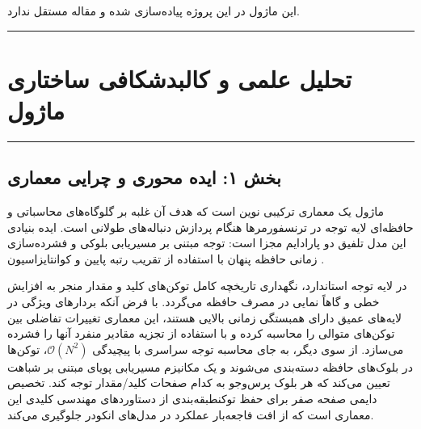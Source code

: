 \clearpage
{}
\vspace*{0.2cm}

این ماژول در این پروژه پیاده‌سازی شده و مقاله مستقل ندارد.
\noindent\rule{\textwidth}{1.2pt}
\vspace*{0.1cm}
\section{تحلیل علمی و کالبدشکافی ساختاری ماژول }
\label{sec:mod_moe_deltakv_paged}
\vspace*{-0.2cm}
\noindent\rule{\textwidth}{0.5pt}
\vspace*{0.3cm}

\subsection*{بخش ۱: ایده محوری و چرایی معماری }
ماژول  یک معماری ترکیبی نوین است که هدف آن غلبه بر گلوگاه‌های محاسباتی و حافظه‌ای لایه توجه در ترنسفورمرها هنگام پردازش دنباله‌های طولانی است. ایده بنیادی این مدل تلفیق دو پارادایم مجزا است: توجه مبتنی بر مسیریابی بلوکی  و فشرده‌سازی زمانی حافظه پنهان با استفاده از تقریب رتبه پایین و کوانتایزاسیون . 

در لایه توجه استاندارد، نگهداری تاریخچه کامل توکن‌های کلید و مقدار  منجر به افزایش خطی و گاهاً نمایی در مصرف حافظه می‌گردد. با فرض آنکه بردارهای ویژگی در لایه‌های عمیق دارای همبستگی زمانی بالایی هستند، این معماری تغییرات تفاضلی بین توکن‌های متوالی را محاسبه کرده و با استفاده از تجزیه مقادیر منفرد  آنها را فشرده می‌سازد. از سوی دیگر، به جای محاسبه توجه سراسری با پیچیدگی $\mathcal{O}(N^2)$، توکن‌ها در بلوک‌های حافظه  دسته‌بندی می‌شوند و یک مکانیزم مسیریابی پویای مبتنی بر شباهت  تعیین می‌کند که هر بلوک پرس‌وجو به کدام صفحات کلید/مقدار توجه کند. تخصیص دایمی صفحه صفر  برای حفظ توکنطبقه‌بندی \lr{([CLS])} از دستاوردهای مهندسی کلیدی این معماری است که از افت فاجعه‌بار عملکرد در مدل‌های انکودر جلوگیری می‌کند.

